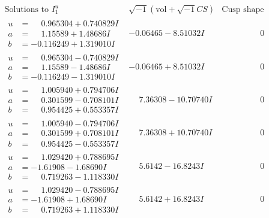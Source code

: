 \documentclass[1p]{elsarticle_modified}
\theoremstyle{definition}
\newcommand{\I}{\sqrt{-1}}
\begin{document}
$$\begin{array}{c|c|c}
\text{Solutions to }I^u_{1}& \I (\text{vol} + \sqrt{-1}CS) & \text{Cusp shape}\\
 \hline 
\begin{aligned}
u &= \phantom{-}0.965304 + 0.740829 I \\
a &= \phantom{-}1.15589 + 1.48686 I \\
b &= -0.116249 + 1.319010 I\end{aligned}
 & -0.06465 - 8.51032 I & \phantom{-0.000000 } 0 \\ \hline\begin{aligned}
u &= \phantom{-}0.965304 - 0.740829 I \\
a &= \phantom{-}1.15589 - 1.48686 I \\
b &= -0.116249 - 1.319010 I\end{aligned}
 & -0.06465 + 8.51032 I & \phantom{-0.000000 } 0 \\ \hline\begin{aligned}
u &= \phantom{-}1.005940 + 0.794706 I \\
a &= \phantom{-}0.301599 - 0.708101 I \\
b &= \phantom{-}0.954425 + 0.553357 I\end{aligned}
 & \phantom{-}7.36308 - 10.70740 I & \phantom{-0.000000 } 0 \\ \hline\begin{aligned}
u &= \phantom{-}1.005940 - 0.794706 I \\
a &= \phantom{-}0.301599 + 0.708101 I \\
b &= \phantom{-}0.954425 - 0.553357 I\end{aligned}
 & \phantom{-}7.36308 + 10.70740 I & \phantom{-0.000000 } 0 \\ \hline\begin{aligned}
u &= \phantom{-}1.029420 + 0.788695 I \\
a &= -1.61908 - 1.68690 I \\
b &= \phantom{-}0.719263 - 1.118330 I\end{aligned}
 & \phantom{-}5.6142 - 16.8243 I & \phantom{-0.000000 } 0 \\ \hline\begin{aligned}
u &= \phantom{-}1.029420 - 0.788695 I \\
a &= -1.61908 + 1.68690 I \\
b &= \phantom{-}0.719263 + 1.118330 I\end{aligned}
 & \phantom{-}5.6142 + 16.8243 I & \phantom{-0.000000 } 0 \\ \hline\begin{aligned}

\end{aligned}
\end{array}$$
\end{document}
